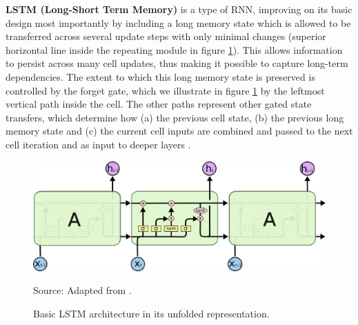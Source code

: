 \noindent
\textbf{LSTM (Long-Short Term Memory)} is a type of RNN, improving on its basic design most importantly by including a long memory state which is allowed to be transferred across several update steps with only minimal changes (superior horizontal line inside the repeating module in figure \ref{fig:lstm}).
This allows information to persist across many cell updates, thus making it possible to capture long-term dependencies.
The extent to which this long memory state is preserved is controlled by the forget gate, which we illustrate in figure \ref{fig:lstm} by the leftmost vertical path inside the cell.
The other paths represent other gated state transfers, which determine how (a) the previous cell state, (b) the previous long memory state and (c) the current cell inputs are combined and passed to the next cell iteration and as input to deeper layers \cite{paneru2015lstm}.
\begin{figure}[H]
   \centering
    \caption{Basic LSTM architecture in its unfolded representation. }
    \includegraphics[scale=0.45]{lstm.png}  \\
    \raggedright
    Source: Adapted from \cite{paneru2015lstm}.
   \label{fig:lstm}
\end{figure}

